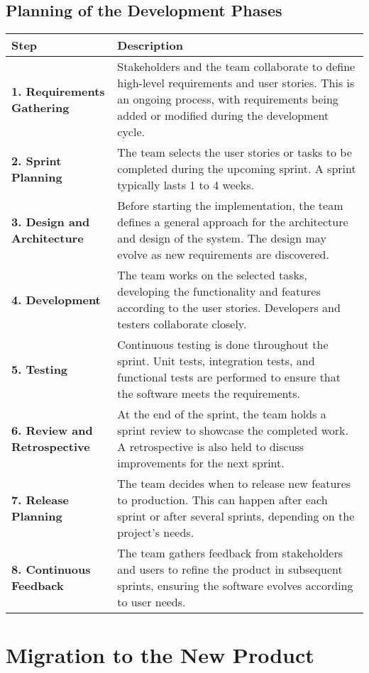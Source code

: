 \documentclass[12pt]{article}
\begin{document}
\subsection{Planning of the Development Phases}
\begin{longtable}{| m{3cm} | m{10cm} |}
  \hline
  \textbf{Step} & \textbf{Description} \\
  \hline
  \textbf{1. Requirements Gathering} & Stakeholders and the team collaborate to define high-level requirements and user stories. This is an ongoing process, with requirements being added or modified during the development cycle. \\
  \hline
  \textbf{2. Sprint Planning} & The team selects the user stories or tasks to be completed during the upcoming sprint. A sprint typically lasts 1 to 4 weeks. \\
  \hline
  \textbf{3. Design and Architecture} & Before starting the implementation, the team defines a general approach for the architecture and design of the system. The design may evolve as new requirements are discovered. \\
  \hline
  \textbf{4. Development} & The team works on the selected tasks, developing the functionality and features according to the user stories. Developers and testers collaborate closely. \\
  \hline
  \textbf{5. Testing} & Continuous testing is done throughout the sprint. Unit tests, integration tests, and functional tests are performed to ensure that the software meets the requirements. \\
  \hline
  \textbf{6. Review and Retrospective} & At the end of the sprint, the team holds a sprint review to showcase the completed work. A retrospective is also held to discuss improvements for the next sprint. \\
  \hline
  \textbf{7. Release Planning} & The team decides when to release new features to production. This can happen after each sprint or after several sprints, depending on the project's needs. \\
  \hline
  \textbf{8. Continuous Feedback} & The team gathers feedback from stakeholders and users to refine the product in subsequent sprints, ensuring the software evolves according to user needs. \\
  \hline
  \end{longtable}

\section{Migration to the New Product}
\end{document}
